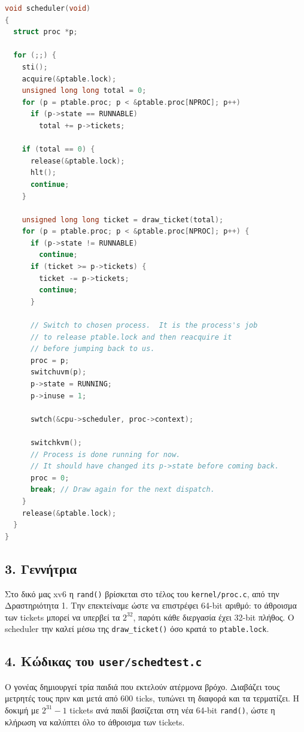 \documentclass[11pt,a4paper]{article}
\begin{document}
\begin{lstlisting}[language=C,firstnumber=281,basicstyle=\ttfamily\scriptsize,lineskip=-0.7pt]
void scheduler(void)
{
  struct proc *p;

  for (;;) {
    sti();
    acquire(&ptable.lock);
    unsigned long long total = 0;
    for (p = ptable.proc; p < &ptable.proc[NPROC]; p++)
      if (p->state == RUNNABLE)
        total += p->tickets;

    if (total == 0) {
      release(&ptable.lock);
      hlt();
      continue;
    }

    unsigned long long ticket = draw_ticket(total);
    for (p = ptable.proc; p < &ptable.proc[NPROC]; p++) {
      if (p->state != RUNNABLE)
        continue;
      if (ticket >= p->tickets) {
        ticket -= p->tickets;
        continue;
      }

      // Switch to chosen process.  It is the process's job
      // to release ptable.lock and then reacquire it
      // before jumping back to us.
      proc = p;
      switchuvm(p);
      p->state = RUNNING;
      p->inuse = 1;

      swtch(&cpu->scheduler, proc->context);

      switchkvm();
      // Process is done running for now.
      // It should have changed its p->state before coming back.
      proc = 0;
      break; // Draw again for the next dispatch.
    }
    release(&ptable.lock);
  }
}
\end{lstlisting}

\subsection*{3. Γεννήτρια}
Στο δικό μας xv6 η \texttt{rand()} βρίσκεται στο τέλος του \texttt{kernel/proc.c}, από την Δραστηριότητα 1. Την επεκτείναμε ώστε να επιστρέφει 64-bit αριθμό: το άθροισμα των tickets μπορεί να υπερβεί τα $2^{32}$, παρότι κάθε διεργασία έχει 32-bit πλήθος. Ο scheduler την καλεί μέσω της \texttt{draw\_ticket()} όσο κρατά το \texttt{ptable.lock}.

\clearpage
\subsection*{4. Κώδικας του \texttt{user/schedtest.c}}
Ο γονέας δημιουργεί τρία παιδιά που εκτελούν ατέρμονα βρόχο. Διαβάζει τους μετρητές τους πριν και μετά από 600 ticks, τυπώνει τη διαφορά και τα τερματίζει.
Η δοκιμή με $2^{31}-1$ tickets ανά παιδί βασίζεται στη νέα 64-bit \texttt{rand()}, ώστε η κλήρωση να καλύπτει όλο το άθροισμα των tickets.
\end{document}
